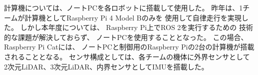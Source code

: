 \documentclass[twocolumn,9pt]{jsproceedings}
\begin{document}
計算機については、ノートPCを各ロボットに搭載して使用した。
昨年は、1チームが計算機としてRaspberry Pi 4 Model Bのみを
使用して自律走行を実現した\cite{池邉2022}。
しかし本年度については、
Raspberry Pi上でROS 2を実行するための
技術的な課題が解決しておらず、
ノートPCを使用することとなった。
この場合、Raspberry Pi Catには、
ノートPCと制御用のRaspberry Piの2台の計算機が搭載されることとなる。
センサ構成としては、各チームの機体に外界センサとして
2次元LiDAR、3次元LiDAR、内界センサとしてIMUを搭載した。

\end{document}
